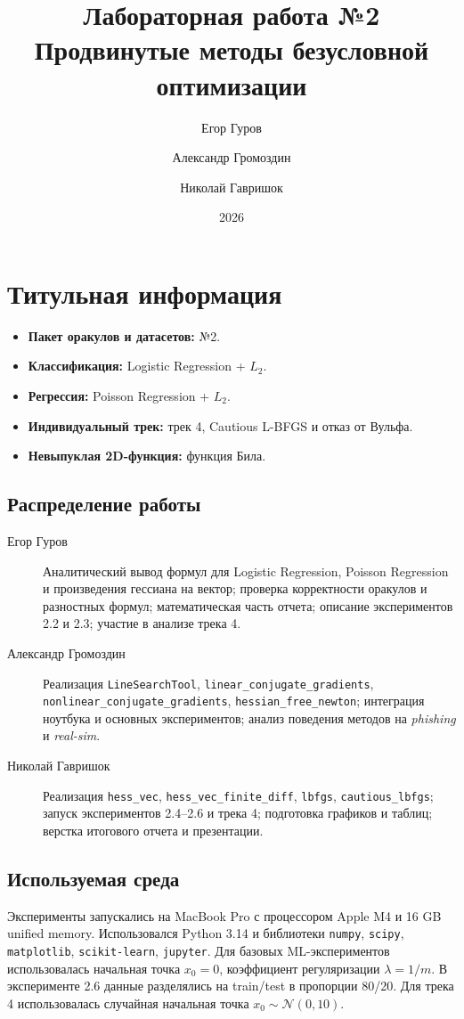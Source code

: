 \documentclass[a4paper,12pt]{article}
\title{Лабораторная работа №2\\Продвинутые методы безусловной оптимизации}
\author{Егор Гуров \and Александр Громоздин \and Николай Гавришок}
\date{2026}
\begin{document}
\maketitle

\section*{Титульная информация}
\begin{itemize}
    \item \textbf{Пакет оракулов и датасетов:} №2.
    \item \textbf{Классификация:} Logistic Regression + $L_2$.
    \item \textbf{Регрессия:} Poisson Regression + $L_2$.
    \item \textbf{Индивидуальный трек:} трек 4, Cautious L-BFGS и отказ от Вульфа.
    \item \textbf{Невыпуклая 2D-функция:} функция Била.
\end{itemize}

\subsection*{Распределение работы}
\begin{description}
    \item[Егор Гуров] Аналитический вывод формул для Logistic Regression, Poisson Regression и произведения гессиана на вектор; проверка корректности оракулов и разностных формул; математическая часть отчета; описание экспериментов 2.2 и 2.3; участие в анализе трека 4.
    \item[Александр Громоздин] Реализация \texttt{LineSearchTool}, \texttt{linear\_conjugate\_gradients}, \texttt{nonlinear\_conjugate\_gradients}, \texttt{hessian\_free\_newton}; интеграция ноутбука и основных экспериментов; анализ поведения методов на \textit{phishing} и \textit{real-sim}.
    \item[Николай Гавришок] Реализация \texttt{hess\_vec}, \texttt{hess\_vec\_finite\_diff}, \texttt{lbfgs}, \texttt{cautious\_lbfgs}; запуск экспериментов 2.4--2.6 и трека 4; подготовка графиков и таблиц; верстка итогового отчета и презентации.
\end{description}

\subsection*{Используемая среда}
Эксперименты запускались на MacBook Pro с процессором Apple M4 и 16 GB unified memory. Использовался Python 3.14 и библиотеки \texttt{numpy}, \texttt{scipy}, \texttt{matplotlib}, \texttt{scikit-learn}, \texttt{jupyter}. Для базовых ML-экспериментов использовалась начальная точка $x_0 = 0$, коэффициент регуляризации $\lambda = 1/m$. В эксперименте 2.6 данные разделялись на train/test в пропорции 80/20. Для трека 4 использовалась случайная начальная точка $x_0 \sim \mathcal{N}(0, 10)$.
\end{document}
